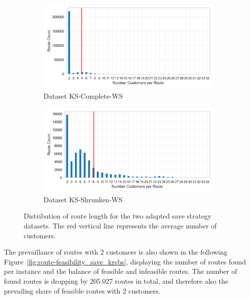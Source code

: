 \begin{figure}[ht]
	\centering
	\begin{subfigure}[t]{.5\textwidth}
		\centering
		\includegraphics[width=\linewidth]{pictures/dataset_structure/no_cust_plot_krebs_28880_600_WS.png}
		\caption{Dataset KS-Complete-WS}
		\label{fig:ds-a-krebs}
	\end{subfigure}%
	\begin{subfigure}[t]{.5\textwidth}
		\centering
		\includegraphics[width=\linewidth]{pictures/dataset_structure/no_cust_plot_krebs_28880_600_WS_Shrinked094.png}
		\caption{Dataset KS-Shrunken-WS}
		\label{fig:ds-b-krebs}
	\end{subfigure}
	\caption{Distribution of route length for the two adapted save strategy datasets. The red vertical line represents the average
		number of customers.}
	\label{fig:route-dists_save_krebs}
\end{figure}

The prevaillance of routes with 2 customers is also shown in the following Figure~\ref{fig:route-feasibility_save_krebs}, displaying the number of routes found per instance and
the balance of feasible and infeasible routes. The number of found routes is dropping by 205.027 routes in total, and therefore
also the prevailing share of feasible routes with 2 customers.

